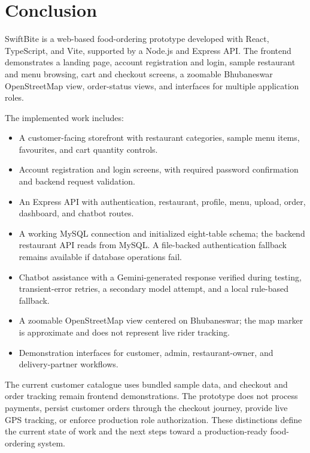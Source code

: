 \chapter{Conclusion}

SwiftBite is a web-based food-ordering prototype developed with React, TypeScript, and Vite, supported by a Node.js and Express API. The frontend demonstrates a landing page, account registration and login, sample restaurant and menu browsing, cart and checkout screens, a zoomable Bhubaneswar OpenStreetMap view, order-status views, and interfaces for multiple application roles.

The implemented work includes:

\begin{itemize}

\item A customer-facing storefront with restaurant categories, sample menu items, favourites, and cart quantity controls.

\item Account registration and login screens, with required password confirmation and backend request validation.

\item An Express API with authentication, restaurant, profile, menu, upload, order, dashboard, and chatbot routes.

\item A working MySQL connection and initialized eight-table schema; the backend restaurant API reads from MySQL. A file-backed authentication fallback remains available if database operations fail.

\item Chatbot assistance with a Gemini-generated response verified during testing, transient-error retries, a secondary model attempt, and a local rule-based fallback.

\item A zoomable OpenStreetMap view centered on Bhubaneswar; the map marker is approximate and does not represent live rider tracking.

\item Demonstration interfaces for customer, admin, restaurant-owner, and delivery-partner workflows.

\end{itemize}

The current customer catalogue uses bundled sample data, and checkout and order tracking remain frontend demonstrations. The prototype does not process payments, persist customer orders through the checkout journey, provide live GPS tracking, or enforce production role authorization. These distinctions define the current state of work and the next steps toward a production-ready food-ordering system.
